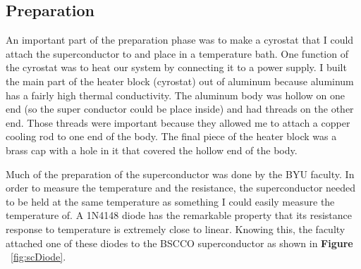 \documentclass[paper=a4, fontsize=11pt]{scrartcl}
\numberwithin{equation}{section}
\numberwithin{figure}{section}
\numberwithin{table}{section}
\begin{document}
      \subsection{Preparation}

            An important part of the preparation phase was to make a cyrostat that I could attach the superconductor to and place in a temperature bath. One function of the cyrostat was to heat our system by connecting it to a power supply. I built the main part of the heater block (cyrostat) out of aluminum because aluminum has a fairly high thermal conductivity. The aluminum body was hollow on one end (so the super conductor could be place inside) and had threads on the other end. Those threads were important because they allowed me to attach a copper cooling rod to one end of the body. The final piece of the heater block was a brass cap with a hole in it that covered the hollow end of the body.

            Much of the preparation of the superconductor was done by the BYU faculty. In order to measure the temperature and the resistance, the superconductor needed to be held at the same temperature as something I could easily measure the temperature of. A 1N4148 diode has the remarkable property that its resistance response to temperature is extremely close to linear. Knowing this, the faculty attached one of these diodes to the BSCCO superconductor as shown in \textbf{Figure} ~\ref{fig:scDiode}.
\end{document}
